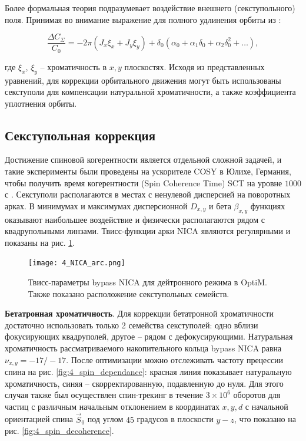 \par Более формальная теория подразумевает воздействие внешнего (секступольного) поля. Принимая во внимание выражение для полного удлинения орбиты из \cite{orbit_length}:

\begin{equation}
\frac{\Delta C_\Sigma}{C_{0}}
=-2\pi\left(J_x\xi_x+J_y\xi_y\right)+\delta_0\left(\alpha_0+\alpha_1\delta_0+\alpha_2\delta_0^2+\ldots\right),
\label{eq:orbit_length}
\end{equation}

\noindent где $\xi_x$, $\xi_y$ – хроматичность в $x, y$ плоскостях. Исходя из представленных уравнений, для коррекции орбитального движения могут быть использованы секступоли для компенсации натуральной хроматичности, а также коэффициента уплотнения орбиты.

		\subsection{Секступольная коррекция}\label{sec:EDM/Wien_filter_tracking/sextupole_correction}

\par Достижение спиновой когерентности является отдельной сложной задачей, и такие эксперименты были проведены на ускорителе COSY в Юлихе, Германия, чтобы получить время когерентности (Spin Coherence Time) SCT на уровне $1000$ с \cite{1000}. Секступоли располагаются в местах с ненулевой дисперсией на поворотных арках. В минимумах и максимумах дисперсионной $D_{x,y}$ и бета $\beta_{x,y}$ функциях оказывают наибольшее воздействие и физически располагаются рядом с квадрупольными линзами. Твисс-функции арки NICA являются регулярными и показаны на рис. \ref{fig:4_NICA_arc}.

\begin{figure}[!h]
  \centering
   \texttt{[image: 4\_NICA\_arc.png]}
   \caption{Твисс-параметры bypass NICA для дейтронного режима в OptiM. Также показано расположение секступольных семейств.}
   \label{fig:4_NICA_arc}
\end{figure}

\textbf{Бетатронная хроматичность}.
Для коррекции бетатронной хроматичности достаточно использовать только 2 семейства секступолей: одно вблизи фокусирующих квадруполей, другое – рядом с дефокусирующими. Натуральная хроматичность рассматриваемого накопительного кольца bypass NICA равна $\nu_{x,y}=-17/-17$. После оптимизации можно отслеживать частоту прецессии спина на рис. \ref{fig:4_spin_dependance}: красная линия показывает натуральную хроматичность, синяя – скорректированную, подавленную до нуля. Для этого случая также был осуществлен спин-трекинг в течение $3\times{10}^6$ оборотов для частиц с различным начальным отклонением в координатах $x, y, d$ с начальной ориентацией спина ${\vec{S}}_0$ под углом $45$ градусов в плоскости $y-z$, что показано на рис. \ref{fig:4_spin_decoherence}.

